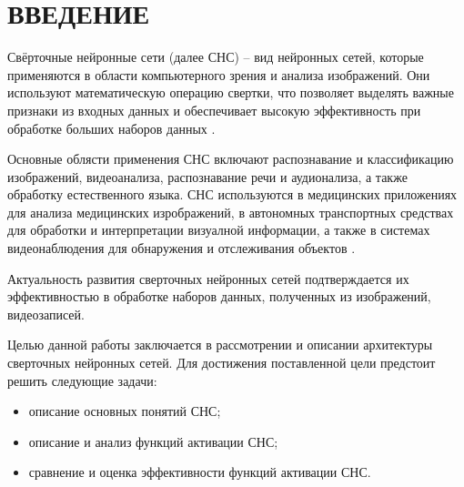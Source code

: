 \chapter*{ВВЕДЕНИЕ}

Свёрточные нейронные сети (далее СНС) -- вид нейронных сетей, которые применяются в области компьютерного зрения и анализа изображений. Они используют математическую операцию свертки, что позволяет выделять важные признаки из входных данных и обеспечивает высокую эффективность при обработке больших наборов данных \cite{understanding}.

Основные облясти применения СНС включают распознавание и классификацию изображений, видеоанализа, распознавание речи и аудионализа, а также обработку естественного языка. СНС используются в медицинских приложениях для анализа медицинских изрображений, в автономных транспортных средствах для обработки и интерпретации визуалной информации, а также в системах видеонаблюдения для обнаружения и отслеживания объектов \cite{survey}.

Актуальность развития сверточных нейронных сетей подтверждается их эффективностью в обработке наборов данных, полученных из изображений, видеозаписей.

Целью данной работы заключается в рассмотрении и описании архитектуры сверточных нейронных сетей.
Для достижения поставленной цели предстоит решить следующие задачи:

\begin{itemize}[label=---]
	\item описание основных понятий СНС;
	\item описание и анализ функций активации СНС;
	\item сравнение и оценка эффективности функций активации СНС.
\end{itemize}
